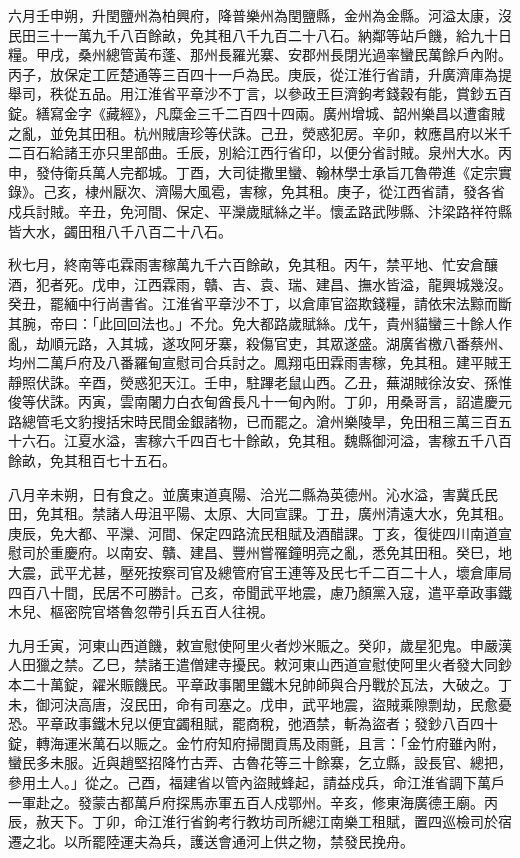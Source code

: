 \begin{pinyinscope}
 六月壬申朔，升閏鹽州為柏興府，降普樂州為閏鹽縣，金州為金縣。河溢太康，沒民田三十一萬九千八百餘畝，免其租八千九百二十八石。納鄰等站戶饑，給九十日糧。甲戌，桑州總管黃布蓬、那州長羅光寨、安郡州長閉光過率蠻民萬餘戶內附。丙子，放保定工匠楚通等三百四十一戶為民。庚辰，從江淮行省請，升廣濟庫為提舉司，秩從五品。用江淮省平章沙不丁言，以參政王巨濟鉤考錢穀有能，賞鈔五百錠。繕寫金字《藏經》，凡糜金三千二百四十四兩。廣州增城、韶州樂昌以遭畬賊之亂，並免其田租。杭州賊唐珍等伏誅。己丑，熒惑犯房。辛卯，敕應昌府以米千二百石給諸王亦只里部曲。壬辰，別給江西行省印，以便分省討賊。泉州大水。丙申，發侍衛兵萬人完都城。丁酉，大司徒撒里蠻、翰林學士承旨兀魯帶進《定宗實錄》。己亥，棣州厭次、濟陽大風雹，害稼，免其租。庚子，從江西省請，發各省戍兵討賊。辛丑，免河間、保定、平灤歲賦絲之半。懷孟路武陟縣、汴梁路祥符縣皆大水，蠲田租八千八百二十八石。



 秋七月，終南等屯霖雨害稼萬九千六百餘畝，免其租。丙午，禁平地、忙安倉釀酒，犯者死。戊申，江西霖雨，贛、吉、袁、瑞、建昌、撫水皆溢，龍興城幾沒。癸丑，罷緬中行尚書省。江淮省平章沙不丁，以倉庫官盜欺錢糧，請依宋法黥而斷其腕，帝曰：「此回回法也。」不允。免大都路歲賦絲。戊午，貴州貓蠻三十餘人作亂，劫順元路，入其城，遂攻阿牙寨，殺傷官吏，其眾遂盛。湖廣省檄八番蔡州、均州二萬戶府及八番羅甸宣慰司合兵討之。鳳翔屯田霖雨害稼，免其租。建平賊王靜照伏誅。辛酉，熒惑犯天江。壬申，駐蹕老鼠山西。乙丑，蕪湖賊徐汝安、孫惟俊等伏誅。丙寅，雲南闍力白衣甸酋長凡十一甸內附。丁卯，用桑哥言，詔遣慶元路總管毛文豹搜括宋時民間金銀諸物，已而罷之。滄州樂陵旱，免田租三萬三百五十六石。江夏水溢，害稼六千四百七十餘畝，免其租。魏縣御河溢，害稼五千八百餘畝，免其租百七十五石。



 八月辛未朔，日有食之。並廣東道真陽、洽光二縣為英德州。沁水溢，害冀氏民田，免其租。禁諸人毋沮平陽、太原、大同宣課。丁丑，廣州清遠大水，免其租。庚辰，免大都、平灤、河間、保定四路流民租賦及酒醋課。丁亥，復徙四川南道宣慰司於重慶府。以南安、贛、建昌、豐州嘗罹鐘明亮之亂，悉免其田租。癸巳，地大震，武平尤甚，壓死按察司官及總管府官王連等及民七千二百二十人，壞倉庫局四百八十間，民居不可勝計。己亥，帝聞武平地震，慮乃顏黨入寇，遣平章政事鐵木兒、樞密院官塔魯忽帶引兵五百人往視。



 九月壬寅，河東山西道饑，敕宣慰使阿里火者炒米賑之。癸卯，歲星犯鬼。申嚴漢人田獵之禁。乙巳，禁諸王遣僧建寺擾民。敕河東山西道宣慰使阿里火者發大同鈔本二十萬錠，糴米賑饑民。平章政事闍里鐵木兒帥師與合丹戰於瓦法，大破之。丁未，御河決高唐，沒民田，命有司塞之。戊申，武平地震，盜賊乘隙剽劫，民愈憂恐。平章政事鐵木兒以便宜蠲租賦，罷商稅，弛酒禁，斬為盜者；發鈔八百四十錠，轉海運米萬石以賑之。金竹府知府掃閭貢馬及雨氈，且言：「金竹府雖內附，蠻民多未服。近與趙堅招降竹古弄、古魯花等三十餘寨，乞立縣，設長官、總把，參用土人。」從之。己酉，福建省以管內盜賊蜂起，請益戍兵，命江淮省調下萬戶一軍赴之。發蒙古都萬戶府探馬赤軍五百人戍鄂州。辛亥，修東海廣德王廟。丙辰，赦天下。丁卯，命江淮行省鉤考行教坊司所總江南樂工租賦，置四巡檢司於宿遷之北。以所罷陸運夫為兵，護送會通河上供之物，禁發民挽舟。




\end{pinyinscope}
